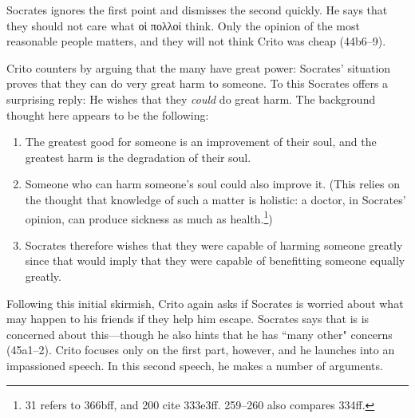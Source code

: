 \documentclass[11pt]{article}
\begin{document}
Socrates ignores the first point and dismisses the second quickly.  He says
that they should not care what {\g οἱ πολλοί} think. Only the opinion of the
most reasonable people matters, and they will not think Crito was cheap
(44b6--9).

Crito counters by arguing that the many have great power:  Socrates' situation
proves that they can do very great harm to someone.  To this Socrates offers
a surprising reply: He wishes that they \emph{could} do great harm.  The
background thought here appears to be the following:

\begin{enumerate}

    \item The greatest good for someone is an improvement of their soul, and
        the greatest harm is the degradation of their soul.

    \item Someone who can harm someone's soul could also improve it.  (This
        relies on the thought that knowledge of such a matter is holistic:
        a doctor, in Socrates' opinion, can produce sickness as much as
        health.\footnote{\citet{adam1988} 31 refers to 
        366bff, and \citet{brickhouse2004} 200 cite  333e3ff.
        \citet{burnet1924} 259--260 also compares  334ff.})

    \item Socrates therefore wishes that they were capable of harming someone
        greatly since that would imply that they were capable of benefitting
        someone equally greatly.

\end{enumerate}

Following this initial skirmish, Crito again asks if Socrates is worried about
what may happen to his friends if they help him escape.  Socrates says that is
is concerned about this---though he also hints that he has ``many other"
concerns (45a1--2).  Crito focuses only on the first part, however, and he
launches into an impassioned speech.  In this second speech, he makes a number
of arguments.
\end{document}
